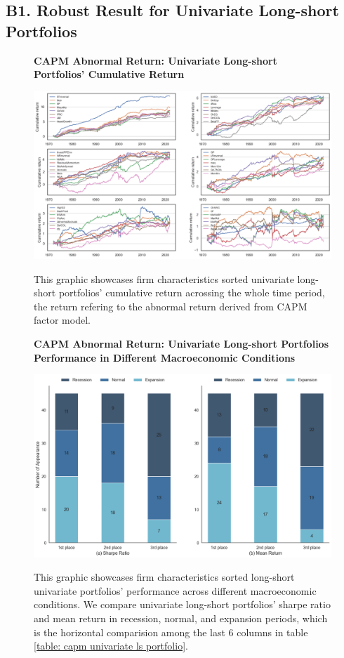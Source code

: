 \subsection*{B1. Robust Result for Univariate Long-short Portfolios}\label{sec:appendixb1}

\begin{figure}[H]
  \centering
  \caption{\textbf{CAPM Abnormal Return: Univariate Long-short Portfolios' Cumulative Return}}
  \includegraphics[width=.8\textwidth]{images/univariate_ls_cum_ret_capm.png}
  \label{fig: capm univariate ls cumulative return}
  \caption*{\footnotesize{This graphic showcases firm characteristics sorted univariate long-short portfolios' cumulative return acrossing the whole time period, the return refering to the abnormal return derived from CAPM factor model.}}
\end{figure}

\begin{figure}[H]
  \centering
  \caption{\textbf{CAPM Abnormal Return: Univariate Long-short Portfolios Performance in Different Macroeconomic Conditions}}
  \includegraphics[width=.8\textwidth]{images/univariant_ls_capm_comparing.png}
  \label{fig: capm univariate ls comparing}
  \caption*{\footnotesize{This graphic showcases firm characteristics sorted long-short univariate portfolios' performance across different macroeconomic conditions. We compare univariate long-short portfolios' sharpe ratio and mean return in recession, normal, and expansion periods, which is the horizontal comparision among the last 6 columns in table \ref{table: capm univariate ls portfolio}.}}
\end{figure}

